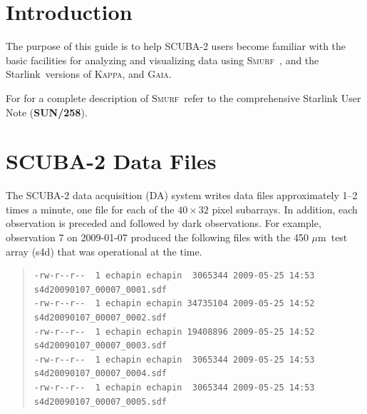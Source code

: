 \documentclass[twoside,11pt]{article}
\newcommand{\micron}{\mbox{\,${\mu}$m}}            %
\newcommand{\stardocinitials}  {SC}
\newcommand{\stardocnumber}    {18.01}
\newcommand{\stardocabstract}  {[Text of abstract]}
\newenvironment{myquote}{\begin{quote}\begin{small}}{\end{small}\end{quote}}
\newcommand{\starlink}{\htmladdnormallink{Starlink}{http://star-www.rl.ac.uk/}}
\newcommand{\Kappa}{\xref{\textsc{Kappa}}{sun95}{}}
\newcommand{\gaia}{\xref{\textsc{Gaia}}{sun214}{}}
\newcommand{\smurf}{\xref{\textsc{Smurf}}{sun258}{}}
\newcommand{\stardocname}{\stardocinitials /\stardocnumber}
\newcommand{\htmladdnormallink}[2]{#1}
\newenvironment{latexonly}{}{}
\newcommand{\xref}[3]{#1}
\newcommand{\xlabel}[1]{}
\renewcommand{\_}{\texttt{\symbol{95}}}
\renewcommand{\thepage}{\roman{page}}
\begin{document}




  \newpage
  \begin{latexonly}
    \setlength{\parskip}{0mm}
    \tableofcontents
    \setlength{\parskip}{\medskipamount}
    \markboth{\stardocname}{\stardocname}
  \end{latexonly}


\cleardoublepage
\renewcommand{\thepage}{\arabic{page}}
\setcounter{page}{1}


\section{\xlabel{introduction}Introduction}

The purpose of this guide is to help SCUBA-2 users become familiar
with the basic facilities for analyzing and visualizing data using
\smurf\ \cite{smurf}, and the \starlink\ versions of \Kappa \cite{kappa},
and \gaia \cite{gaia}.

For for a complete description of \smurf\ refer to the comprehensive
Starlink User Note (\xref{\textbf{SUN/258}}{sun258}{}).


\section{\xlabel{data_files}SCUBA-2 Data Files}

The SCUBA-2 data acquisition (DA) system writes data files
approximately 1--2 times a minute, one file for each of the
$40\times32$ pixel subarrays. In addition, each observation is
preceded and followed by dark observations. For example, observation 7
on 2009-01-07 produced the following files with the 450\,\micron\ test
array (s4d) that was operational at the time.

\begin{myquote}
\begin{verbatim}
-rw-r--r--  1 echapin echapin  3065344 2009-05-25 14:53 s4d20090107_00007_0001.sdf
-rw-r--r--  1 echapin echapin 34735104 2009-05-25 14:52 s4d20090107_00007_0002.sdf
-rw-r--r--  1 echapin echapin 19408896 2009-05-25 14:52 s4d20090107_00007_0003.sdf
-rw-r--r--  1 echapin echapin  3065344 2009-05-25 14:53 s4d20090107_00007_0004.sdf
-rw-r--r--  1 echapin echapin  3065344 2009-05-25 14:53 s4d20090107_00007_0005.sdf
\end{verbatim}
\end{myquote}
\end{document}
